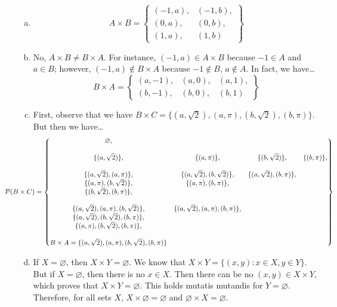 \documentclass[11pt,letterpaper]{article}
\begin{document}
\sol 
\begin{enumerate}[(a)]
\item 
	\[
	A \times B= 
	\left\{
	\begin{matrix}
	(-1, a), & (-1, b), \\
	(0, a), & (0, b), \\
	(1, a), & (1, b)
	\end{matrix}
	\right\}
	\] \pspace

\item No, $A \times B \neq B \times A$. For instance, $(-1, a) \in A \times B$ because $-1 \in A$ and $a \in B$; however, $(-1, a) \notin B \times A$ because $-1 \notin B$, $a \notin A$. In fact, we have\dots
	\[
	B \times A= 
	\left\{
	\begin{matrix}
	(a, -1), & (a, 0), & (a, 1), \\
	(b, -1), & (b, 0), & (b, 1)
	\end{matrix}
	\right\}
	\] \pspace

\item First, observe that we have $B \times C= \{ (a, \sqrt{2}), (a, \pi), (b, \sqrt{2}), (b, \pi) \}$. But then we have\dots
	\[
	\hspace{-1.5cm} \mathcal{P}(B \times C)= 
	\left\{
	\begin{matrix}
	\varnothing, \\ \\
	\{ (a, \sqrt{2}) \}, & \{ (a, \pi) \}, & \{ (b, \sqrt{2}) \}, & \{ (b, \pi) \}, \\ \\
	\{ (a, \sqrt{2}), (a, \pi) \}, & \{ (a, \sqrt{2}), (b, \sqrt{2}) \}, & \{ (a, \sqrt{2}), (b, \pi) \}, \\
	\{ (a, \pi), (b, \sqrt{2}) \}, & \{ (a, \pi), (b, \pi) \}, \\
	\{ (b, \sqrt{2}), (b, \pi) \}, \\ \\
	\{ (a, \sqrt{2}), (a, \pi), (b, \sqrt{2}) \}, & \{ (a, \sqrt{2}), (a, \pi), (b, \pi) \}, \\
	\{ (a, \sqrt{2}), (b, \sqrt{2}), (b, \pi) \}, \\
	\{ (a, \pi), (b, \sqrt{2}), (b, \pi) \}, \\ \\
	B \times A=  \{ (a, \sqrt{2}), (a, \pi), (b, \sqrt{2}), (b, \pi) \}
	\end{matrix}
	\right\}
	\] \pspace

\item If $X= \varnothing$, then $X \times Y= \varnothing$. We know that $X \times Y= \{ (x, y) \colon x \in X, y \in Y \}$. But if $X= \varnothing$, then there is no $x \in X$. Then there can be no $(x, y) \in X \times Y$, which proves that $X \times Y= \varnothing$. This holds mutatis mutandis for $Y= \varnothing$. Therefore, for all sets $X$, $X \times \varnothing= \varnothing$ and $\varnothing \times X= \varnothing$. \pspace


\end{enumerate}
\end{document}
